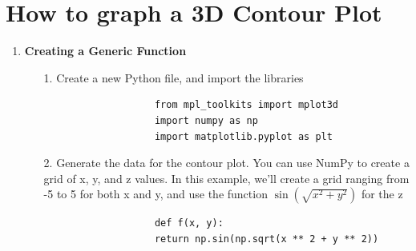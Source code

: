 \documentclass[
11pt, %
a4paper, %
oneside, %
headinclude,footinclude, %
BCOR5mm, %
]{scrartcl}
\begin{document}

\section{How to graph a 3D Contour Plot}

\begin{enumerate}
	\item \textbf{Creating a Generic Function}
	
	\begin{enumerate}
		\item[1.] Create a new Python file, and import the libraries
		\begin{enumerate}
			\item[] \begin{verbatim}
				from mpl_toolkits import mplot3d
				import numpy as np
				import matplotlib.pyplot as plt
			\end{verbatim}
		\end{enumerate}
		\item[2.] Generate the data for the contour plot. You can use NumPy to create a grid of x, y, and z values. In this example, we'll create a grid ranging from -5 to 5 for both x and y, and use the function $\sin(\sqrt{x^2 + y^2})$ for the z
		\begin{enumerate}
			\item[] \begin{verbatim}
				def f(x, y):
				return np.sin(np.sqrt(x ** 2 + y ** 2))
				

\end{verbatim}
\end{enumerate}
\end{enumerate}
\end{enumerate}
\end{document}
